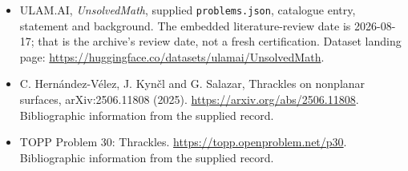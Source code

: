 \documentclass[11pt,a4paper]{article}
\begin{document}
{\small

\begin{itemize}

\item[\hypertarget{source:statement:1}{S1}] ULAM.AI, \emph{UnsolvedMath}, supplied \texttt{problems.json}, catalogue entry, statement and background. The embedded literature-review date is 2026-08-17; that is the archive’s review date, not a fresh certification. Dataset landing page: \url{https://huggingface.co/datasets/ulamai/UnsolvedMath}.

\item[\hypertarget{source:statement:2}{S2}] C. Hernández-Vélez, J. Kynčl and G. Salazar, Thrackles on nonplanar surfaces, arXiv:2506.11808 (2025). \url{https://arxiv.org/abs/2506.11808}. Bibliographic information from the supplied record.

\item[\hypertarget{source:statement:3}{S3}] TOPP Problem 30: Thrackles. \url{https://topp.openproblem.net/p30}. Bibliographic information from the supplied record.

\end{itemize}

}

\label{end:statement}
\end{document}
